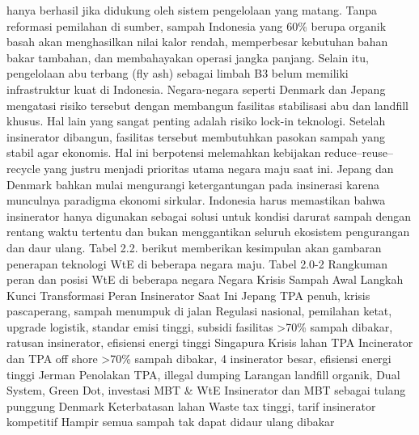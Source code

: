 \documentclass[
  letterpaper,
  DIV=11,
  numbers=noendperiod]{scrreprt}
\begin{document}
hanya berhasil jika didukung oleh sistem pengelolaan yang matang. Tanpa
reformasi pemilahan di sumber, sampah Indonesia yang 60\% berupa organik
basah akan menghasilkan nilai kalor rendah, memperbesar kebutuhan bahan
bakar tambahan, dan membahayakan operasi jangka panjang. Selain itu,
pengelolaan abu terbang (fly ash) sebagai limbah B3 belum memiliki
infrastruktur kuat di Indonesia. Negara-negara seperti Denmark dan
Jepang mengatasi risiko tersebut dengan membangun fasilitas stabilisasi
abu dan landfill khusus. Hal lain yang sangat penting adalah risiko
lock-in teknologi. Setelah insinerator dibangun, fasilitas tersebut
membutuhkan pasokan sampah yang stabil agar ekonomis. Hal ini berpotensi
melemahkan kebijakan reduce--reuse--recycle yang justru menjadi
prioritas utama negara maju saat ini. Jepang dan Denmark bahkan mulai
mengurangi ketergantungan pada insinerasi karena munculnya paradigma
ekonomi sirkular. Indonesia harus memastikan bahwa insinerator hanya
digunakan sebagai solusi untuk kondisi darurat sampah dengan rentang
waktu tertentu dan bukan menggantikan seluruh ekosistem pengurangan dan
daur ulang. Tabel 2.2. berikut memberikan kesimpulan akan gambaran
penerapan teknologi WtE di beberapa negara maju. Tabel 2.0-2 Rangkuman
peran dan posisi WtE di beberapa negara Negara Krisis Sampah Awal
Langkah Kunci Transformasi Peran Insinerator Saat Ini Jepang TPA penuh,
krisis pascaperang, sampah menumpuk di jalan Regulasi nasional,
pemilahan ketat, upgrade logistik, standar emisi tinggi, subsidi
fasilitas \textgreater70\% sampah dibakar, ratusan insinerator,
efisiensi energi tinggi Singapura Krisis lahan TPA Incinerator dan TPA
off shore \textgreater70\% sampah dibakar, 4 insinerator besar,
efisiensi energi tinggi Jerman Penolakan TPA, illegal dumping Larangan
landfill organik, Dual System, Green Dot, investasi MBT \& WtE
Insinerator dan MBT sebagai tulang punggung Denmark Keterbatasan lahan
Waste tax tinggi, tarif insinerator kompetitif Hampir semua sampah tak
dapat didaur ulang dibakar
\end{document}
